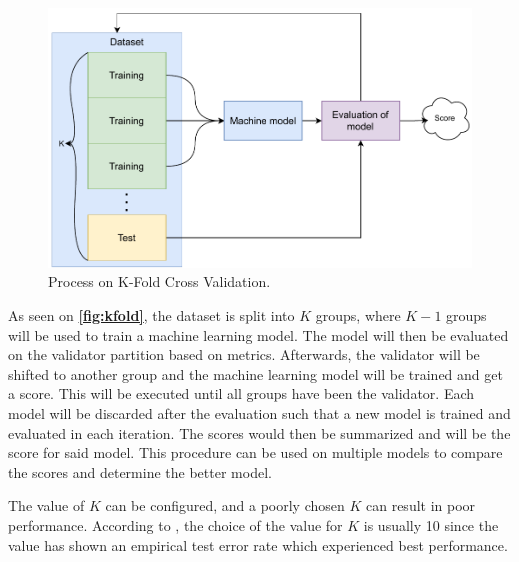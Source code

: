 \begin{figure}[H]
    \centering
    \includegraphics[scale = 0.7]{Images/Experiments/k_fold.pdf}
    \caption{Process on K-Fold Cross Validation.}
    \label{fig:kfold}
\end{figure}

As seen on \textbf{\autoref{fig:kfold}}, the dataset is split into $K$ groups, where $K-1$ groups will be used to train a machine learning model. The model will then be evaluated on the validator partition based on metrics. Afterwards, the validator will be shifted to another group and the machine learning model will be trained and get a score. This will be executed until all groups have been the validator. Each model will be discarded after the evaluation such that a new model is trained and evaluated in each iteration. The scores would then be summarized and will be the score for said model.
This procedure can be used on multiple models to compare the scores and determine the better model.

The value of $K$ can be configured, and a poorly chosen $K$ can result in poor performance. According to \cite{kfold_configk}, the choice of the value for $K$ is usually 10 since the value has shown an empirical test error rate which experienced best performance.    

